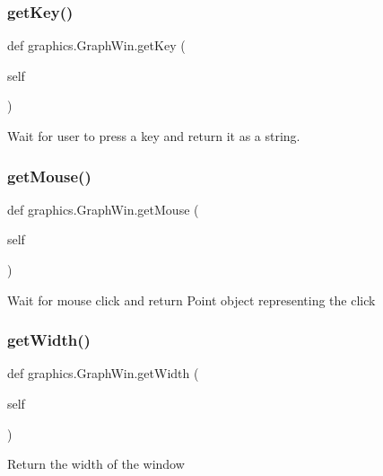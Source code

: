 \subsubsection{\texorpdfstring{get\+Key()}{getKey()}}
{\footnotesize\ttfamily def graphics.\+Graph\+Win.\+get\+Key (\begin{DoxyParamCaption}\item[{}]{self }\end{DoxyParamCaption})}

\begin{DoxyVerb}Wait for user to press a key and return it as a string.\end{DoxyVerb}
 \mbox{\label{classgraphics_1_1_graph_win_a4fdf1cf728e9aa559f2912592f66c23e}} 
\subsubsection{\texorpdfstring{get\+Mouse()}{getMouse()}}
{\footnotesize\ttfamily def graphics.\+Graph\+Win.\+get\+Mouse (\begin{DoxyParamCaption}\item[{}]{self }\end{DoxyParamCaption})}

\begin{DoxyVerb}Wait for mouse click and return Point object representing
the click\end{DoxyVerb}
 \mbox{\label{classgraphics_1_1_graph_win_a5bad6bf8b35250baf4f4b45993f85162}} 
\subsubsection{\texorpdfstring{get\+Width()}{getWidth()}}
{\footnotesize\ttfamily def graphics.\+Graph\+Win.\+get\+Width (\begin{DoxyParamCaption}\item[{}]{self }\end{DoxyParamCaption})}

\begin{DoxyVerb}Return the width of the window\end{DoxyVerb}
 \mbox{\label{classgraphics_1_1_graph_win_ac93adafee6ea1c0d9bb32b64cfbe754c}} 
